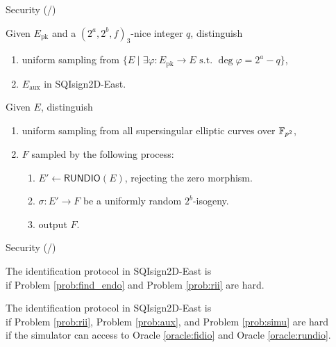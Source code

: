 \begin{frame}{Security (/\securitytotal{})}
    \begin{prob}\label{prob:aux}
        Given $E_\mathrm{pk}$ and a $(2^a, 2^b, f)_3$-nice integer $q$, distinguish
        \begin{enumerate}
            \item uniform sampling from $\{E \mid \exists\varphi: E_\mathrm{pk} \to E \text{ s.t. } \deg\varphi = 2^a - q\}$,
            \item $E_\mathrm{aux}$ in SQIsign2D-East.
        \end{enumerate}
    \end{prob}

    \vspace{5pt}
    \begin{prob}\label{prob:simu}
        Given $E$, distinguish
        \begin{enumerate}
            \item uniform sampling from all supersingular elliptic curves over $\mathbb{F}_{p^2}$,
            \item $F$ sampled by the following process:
            \begin{enumerate}
                \normalsize
                \item $E' \leftarrow \textsf{RUNDIO}(E)$, rejecting the zero morphism.
                \item $\sigma : E' \to F$ be a uniformly random $2^b$-isogeny.
                \item output $F$.
            \end{enumerate}
        \end{enumerate}
    \end{prob}
\end{frame}

\begin{frame}{Security (/\securitytotal{})}
    \begin{theorem}[Soundness]
        The identification protocol in SQIsign2D-East is
        \\
        if Problem \ref{prob:find_endo} and Problem \ref{prob:rii} are hard.
    \end{theorem}

    \vspace{10pt}
    \begin{theorem}
        The identification protocol in SQIsign2D-East is \\
        if Problem \ref{prob:rii}, Problem \ref{prob:aux}, and Problem \ref{prob:simu} are hard\\
        if the simulator can access to Oracle \ref{oracle:fidio} and Oracle \ref{oracle:rundio}.
    \end{theorem}
\end{frame}

